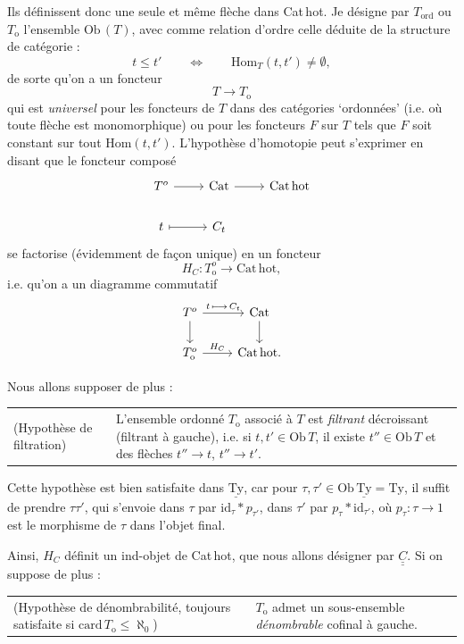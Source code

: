 \documentclass[11pt]{article}
\newcommand{\printedpage}[1]{\marginpar{\footnotesize p.~#1}}
\newcommand{\msp}[1]{\marginpar{\vspace*{10pt}\footnotesize [#1]}}
\newcommand{\uTy}{\underline{\mathrm{Ty}}}
\newcommand{\Hom}{\mathrm{Hom}}
\newcommand{\Cat}{\mathrm{Cat}}
\newcommand{\Cathot}{\mathrm{Cat\,hot}}
\newcommand{\Ob}{\mathrm{Ob}\,}
\newcommand{\To}{T_{\mathrm{o}}}
\begin{document}
Ils définissent donc une seule et même flèche dans Cat\,hot. Je désigne par $T_{\mathrm{ord}}$ ou $\To$ l'ensemble $\Ob(T)$, avec comme relation d'ordre celle déduite de la structure de catégorie :
\[
t \leq t' \qquad\Longleftrightarrow\qquad \Hom_{T}(t,t') \neq \emptyset,
\]
de sorte qu'on a un foncteur
\[
T \longrightarrow \To
\]
qui est \textit{universel} pour les foncteurs de $T$ dans des catégories ‘ordonnées' (i.e. où toute flèche est monomorphique) ou pour les foncteurs $F$ sur $T$ tels que $F$ soit constant sur tout $\Hom(t,t')$. L'hypothèse d'homotopie peut s'exprimer en disant que le foncteur composé
\[
\begin{tikzcd}
T^{o} \arrow[r] & \Cat \arrow[r] & \Cathot \\
t \arrow[r, mapsto] & C_{t} &
\end{tikzcd}
\]
\msp{page 100}
se factorise (évidemment de façon unique) en un foncteur
\[
H_{C} : \To^{o} \longrightarrow \Cathot,
\]
i.e. qu'on a un diagramme commutatif
\printedpage{65}
\[
\begin{tikzcd}
T^{o} \arrow[r, "t\,\longmapsto\, C_{t}"] \arrow[d] & \Cat \arrow[d] \\
\To^{o} \arrow[r, "H_{C}"] & \Cathot.
\end{tikzcd}
\]

Nous allons supposer de plus :

\noindent\begin{tabular}{@{}p{}p{}@{}}
(Hypothèse de filtration) & L'ensemble ordonné $\To$ associé à $T$ est \textit{filtrant} décroissant (filtrant à gauche), i.e. si $t,t' \in \Ob T$, il existe $t'' \in \Ob T$ et des flèches $t'' \longrightarrow t$, $t'' \longrightarrow t'$.
\end{tabular}

Cette hypothèse est bien satisfaite dans $\uTy$, car pour $\tau,\tau' \in \Ob \uTy = \mathrm{Ty}$, il suffit de prendre $\tau\tau'$, qui s'envoie dans $\tau$ par $\mathrm{id}_{\tau} * p_{\tau'}$, dans $\tau'$ par $p_{\tau} * \mathrm{id}_{\tau'}$, où $p_{\tau} : \tau \longrightarrow 1$ est le morphisme de $\tau$ dans l'objet final.

Ainsi, $H_{C}$ définit un ind-objet de Cat\,hot, que nous allons désigner par $\underline{\underline{C}}$. Si on suppose de plus :

\noindent\begin{tabular}{@{}p{}p{}@{}}
(Hypothèse de dénombrabilité, toujours satisfaite si $\mathrm{card}\,\To \leq \aleph_{0}$) & $\To$ admet un sous-ensemble \textit{dénombrable} cofinal à gauche.
\end{tabular}
\end{document}
